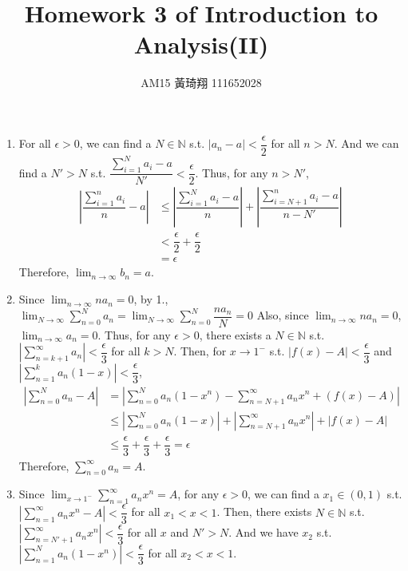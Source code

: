\documentclass[12pt]{article}
\title{Homework 3 of Introduction to Analysis(II)}
\author{AM15 黃琦翔 111652028}
\begin{document}
\maketitle
\begin{enumerate}
    \item For all $\epsilon > 0$, we can find a $N \in \mathbb{N}$ s.t. $|a_n - a| < \dfrac{\epsilon}{2}$ for all $n > N$.
    And we can find a $N' > N$ s.t. $\dfrac{\displaystyle\sum_{i=1}^{N} a_i - a}{N'} < \dfrac{\epsilon}{2}$.
    Thus, for any $n > N'$, \begin{align*}
        |\dfrac{\sum_{i=1}^{n} a_i }{n} - a| &\leq |\dfrac{\sum_{i=1}^{N} a_i - a}{n}| + |\dfrac{\sum_{i=N+1}^{n} a_i - a}{n - N'}|\\
        &< \dfrac{\epsilon}{2} + \dfrac{\epsilon}{2}\\
        &= \epsilon
    \end{align*}
    Therefore, $\displaystyle\lim_{n\to\infty} b_n = a$.

    \item Since $\displaystyle\lim_{n\to\infty} na_n = 0$, by 1., $\displaystyle\lim_{N\to\infty} \displaystyle\sum_{n=0}^{N} a_n = \displaystyle\lim_{N\to\infty} \displaystyle\sum_{n=0}^{N} \dfrac{na_n}{N} = 0$
    Also, since $\displaystyle\lim_{n\to\infty} na_n = 0$, $\displaystyle\lim_{n\to\infty} a_n = 0$.
    Thus, for any $\epsilon > 0$,  there exists a $N \in \mathbb{N}$ s.t. $|\displaystyle\sum_{n=k+1}^{\infty} a_n| < \dfrac{\epsilon}{3}$ for all $k > N$.
    Then, for $x \to 1^{-}$ s.t. $|f(x) - A| < \dfrac{\epsilon}{3}$ and $|\displaystyle\sum_{n=1}^{k} a_n(1-x)| < \dfrac{\epsilon}{3}$, \begin{align*}
        |\sum_{n=0}^{N} a_n - A| &= |\sum_{n=0}^{N} a_n(1-x^n) - \sum_{n=N+1}^{\infty} a_n x^n + (f(x) - A)|\\
        &\leq |\sum_{n=0}^{N} a_n(1-x)| + |\sum_{n=N+1}^{\infty} a_n x^n| + |f(x) - A|\\
        &\leq \dfrac{\epsilon}{3} + \dfrac{\epsilon}{3} + \dfrac{\epsilon}{3} = \epsilon
    \end{align*}
    Therefore, $\displaystyle\sum_{n=0}^{\infty} a_n = A$.

    \newpage
    \item Since $\displaystyle\lim_{x\to 1^-} \displaystyle\sum_{n=1}^{\infty} a_nx^n = A$,
    for any $\epsilon > 0$, we can find a $x_1 \in (0, 1)$ s.t. $|\displaystyle\sum_{n=1}^{\infty} a_nx^n - A| < \dfrac{\epsilon}{3}$ for all $x_1 < x < 1$.
    Then, there exists $N\in\mathbb{N}$ s.t. $|\displaystyle\sum_{n=N'+1}^{\infty} a_n x^n| < \dfrac{\epsilon}{3}$ for all $x$ and $N' > N$.
    And we have $x_2$ s.t. $|\displaystyle\sum_{n=1}^{N} a_n(1-x^n)| < \dfrac{\epsilon}{3}$ for all $x_2 < x < 1$.


\end{enumerate}
\end{document}
